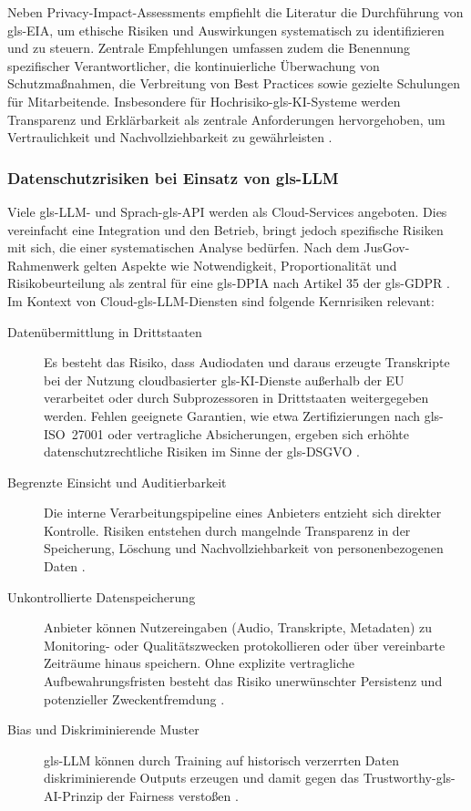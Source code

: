 Neben Privacy-Impact-Assessments empfiehlt die Literatur die Durchführung von \gls{gls-EIA}, um ethische Risiken und Auswirkungen systematisch zu identifizieren und zu steuern. Zentrale Empfehlungen umfassen zudem die Benennung spezifischer Verantwortlicher, die kontinuierliche Überwachung von Schutzmaßnahmen, die Verbreitung von Best Practices sowie gezielte Schulungen für Mitarbeitende. Insbesondere für Hochrisiko-\gls{gls-KI}-Systeme werden Transparenz und Erklärbarkeit als zentrale Anforderungen hervorgehoben, um Vertraulichkeit und Nachvollziehbarkeit zu gewährleisten \parencite{Schmiedchen2026KI}.

\subsubsection{Datenschutzrisiken bei Einsatz von \gls{gls-LLM}}

Viele \gls{gls-LLM}- und Sprach-\gls{gls-API} werden als Cloud-Services angeboten. Dies vereinfacht eine Integration und den Betrieb, bringt jedoch spezifische Risiken mit sich, die einer systematischen Analyse bedürfen. Nach dem JusGov-Rahmenwerk gelten Aspekte wie Notwendigkeit, Proportionalität und Risikobeurteilung als zentral für eine \gls{gls-DPIA} nach Artikel 35 der \gls{gls-GDPR} \parencite{ssrn5348245}.\\Im Kontext von Cloud-\gls{gls-LLM}-Diensten sind folgende Kernrisiken relevant:
\clearpage
\begin{description}
\item[Datenübermittlung in Drittstaaten]
Es besteht das Risiko, dass Audiodaten und daraus erzeugte Transkripte bei der Nutzung cloudbasierter \gls{gls-KI}-Dienste au\ss erhalb der EU verarbeitet oder durch Subprozessoren in Drittstaaten weitergegeben werden. Fehlen geeignete Garantien, wie etwa Zertifizierungen nach \gls{gls-ISO}~27001 oder vertragliche Absicherungen, ergeben sich erhöhte datenschutzrechtliche Risiken im Sinne der \gls{gls-DSGVO} \parencite{Data2025_AIDataQuality}.

\item[Begrenzte Einsicht und Auditierbarkeit]
Die interne Verarbeitungspipeline eines Anbieters entzieht sich direkter Kontrolle. Risiken entstehen durch mangelnde Transparenz in der Speicherung, Löschung und Nachvollziehbarkeit von personenbezogenen Daten \parencite{ssrn5348245}.

\item[Unkontrollierte Datenspeicherung]
Anbieter können Nutzereingaben (Audio, Transkripte, Metadaten) zu Monitoring- oder Qualitätszwecken protokollieren oder über vereinbarte Zeiträume hinaus speichern. Ohne explizite vertragliche Aufbewahrungsfristen besteht das Risiko unerwünschter Persistenz und potenzieller Zweckentfremdung \parencite{Data2025_AIDataQuality}.

\item[Bias und Diskriminierende Muster]
\gls{gls-LLM} können durch Training auf historisch verzerrten Daten diskriminierende Outputs erzeugen und damit gegen das Trustworthy-\gls{gls-AI}-Prinzip der Fairness versto\ss en \parencite{ssrn5348245}.
\end{description}

